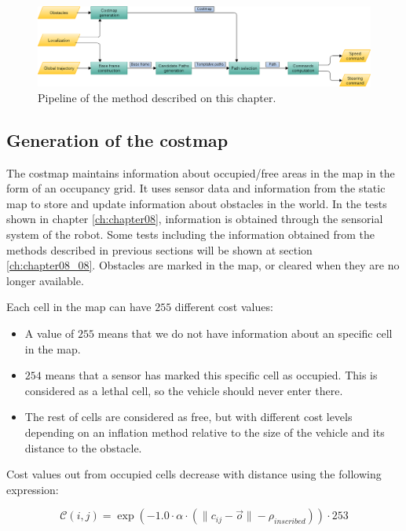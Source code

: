 \begin{figure}[h!]
        \centering
        \includegraphics[width=\textwidth]{pipeline}
        \caption{Pipeline of the method described on this chapter.}\label{fig:cp07_pipeline}
\end{figure}

\subsection{Generation of the costmap}\label{ch:chapter07_01_01}

The costmap maintains information about occupied/free areas in the map in the form of an occupancy grid. It uses sensor data and information from the static map to store and update information about obstacles in the world. In the tests shown in chapter \ref{ch:chapter08}, information is obtained through the sensorial system of the robot. Some tests including the information obtained from the methods described in previous sections will be shown at section \ref{ch:chapter08_08}. Obstacles are marked in the map, or cleared when they are no longer available.

Each cell in the map can have $255$ different cost values:
\begin{itemize}
 \item A value of $255$ means that we do not have information about an specific cell in the map.
 \item $254$ means that a sensor has marked this specific cell as occupied. This is considered as a lethal cell, so the vehicle should never enter there.
 \item The rest of cells are considered as free, but with different cost levels depending on an inflation method relative to the size of the vehicle and its distance to the obstacle.
\end{itemize}

Cost values out from occupied cells decrease with distance using the following expression:

\begin{equation}\label{eq:cp07_costmap_inflation}
 \mathcal{C}(i, j) = \exp (-1.0 \cdot \alpha \cdot ( \|c_{ij}-\vec{o}\| - \rho_{inscribed})) \cdot 253
\end{equation}

